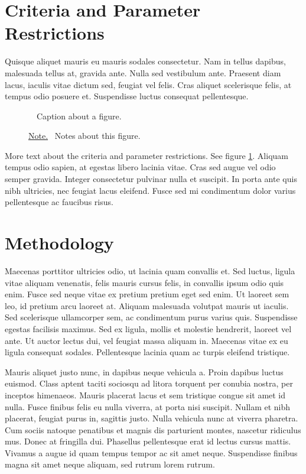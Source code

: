 \documentclass[letterpaper]{kuthesis}
\begin{document}
\section{Criteria and Parameter Restrictions}
Quisque aliquet mauris eu mauris sodales consectetur. Nam in tellus dapibus, malesuada tellus at, gravida ante. Nulla sed vestibulum ante. Praesent diam lacus, iaculis vitae dictum sed, feugiat vel felis. Cras aliquet scelerisque felis, at tempus odio posuere et. Suspendisse luctus consequat pellentesque.\\
\begin{figure}[h]
  \centering
  \caption{\ \ Caption about a figure.}
  \caption*{\underline{Note.} \ Notes about this figure.}
  \label{figure:1}
\end{figure}
\par \bigskip %
More text about the criteria and parameter restrictions.  See figure \ref{figure:1}. Aliquam tempus odio sapien, at egestas libero lacinia vitae. Cras sed augue vel odio semper gravida. Integer consectetur pulvinar nulla et suscipit. In porta ante quis nibh ultricies, nec feugiat lacus eleifend. Fusce sed mi condimentum dolor varius pellentesque ac faucibus risus.
\section{Methodology}
Maecenas porttitor ultricies odio, ut lacinia quam convallis et. Sed luctus, ligula vitae aliquam venenatis, felis mauris cursus felis, in convallis ipsum odio quis enim. Fusce sed neque vitae ex pretium pretium eget sed enim. Ut laoreet sem leo, id pretium arcu laoreet at. Aliquam malesuada volutpat mauris ut iaculis. Sed scelerisque ullamcorper sem, ac condimentum purus varius quis. Suspendisse egestas facilisis maximus. Sed ex ligula, mollis et molestie hendrerit, laoreet vel ante. Ut auctor lectus dui, vel feugiat massa aliquam in. Maecenas vitae ex eu ligula consequat sodales. Pellentesque lacinia quam ac turpis eleifend tristique.
\par Mauris aliquet justo nunc, in dapibus neque vehicula a. Proin dapibus luctus euismod. Class aptent taciti sociosqu ad litora torquent per conubia nostra, per inceptos himenaeos. Mauris placerat lacus et sem tristique congue sit amet id nulla. Fusce finibus felis eu nulla viverra, at porta nisi suscipit. Nullam et nibh placerat, feugiat purus in, sagittis justo. Nulla vehicula nunc at viverra pharetra. Cum sociis natoque penatibus et magnis dis parturient montes, nascetur ridiculus mus. Donec at fringilla dui. Phasellus pellentesque erat id lectus cursus mattis. Vivamus a augue id quam tempus tempor ac sit amet neque. Suspendisse finibus magna sit amet neque aliquam, sed rutrum lorem rutrum.
\end{document}
